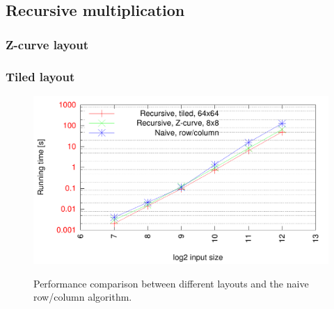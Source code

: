 

\subsection{Recursive multiplication}

\subsubsection{Z-curve layout}



\subsubsection{Tiled layout}


\begin{figure}[h!]
  \centering
  \includegraphics[width=\textwidth]{"../project2/gnuplots/recursive_performance"}
  \label{fig:recursive_layout_performance}
  \caption{Performance comparison between different layouts and the naive row/column algorithm.}
\end{figure}

